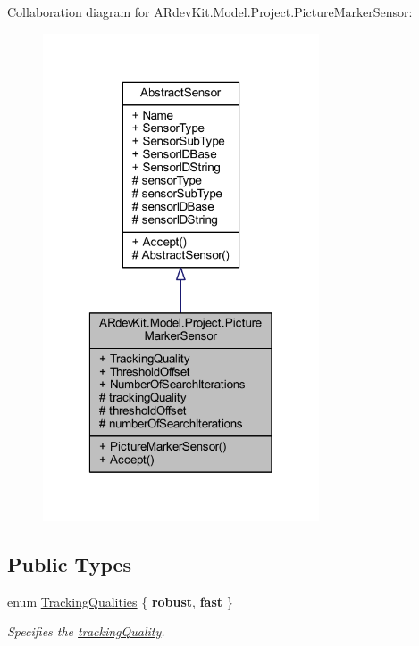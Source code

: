 Collaboration diagram for A\-Rdev\-Kit.\-Model.\-Project.\-Picture\-Marker\-Sensor\-:
\nopagebreak
\begin{figure}[H]
\begin{center}
\leavevmode
\includegraphics[width=232pt]{class_a_rdev_kit_1_1_model_1_1_project_1_1_picture_marker_sensor__coll__graph}
\end{center}
\end{figure}
\subsection*{Public Types}
\begin{DoxyCompactItemize}
\item 
enum \hyperlink{class_a_rdev_kit_1_1_model_1_1_project_1_1_picture_marker_sensor_aff811596849fce290f77dea5f63b16c6}{Tracking\-Qualities} \{ {\bfseries robust}, 
{\bfseries fast}
 \}
\begin{DoxyCompactList}\small\item\em Specifies the \hyperlink{class_a_rdev_kit_1_1_model_1_1_project_1_1_picture_marker_sensor_aca44e5fc01c413ccf52a6566ee98ec70}{tracking\-Quality}. \end{DoxyCompactList}\end{DoxyCompactItemize}
